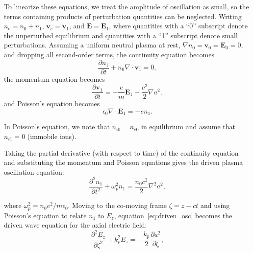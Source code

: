     To linearize these equations, we treat the amplitude of oscillation as
    small, so the terms containing products of perturbation quantities can be
    neglected. Writing $n_e = n_0 + n_1$, 
    $\mathbf{v}_e = \mathbf{v}_1$, and $\mathbf{E} = \mathbf{E}_1$,
    where quantities with a ``0'' subscript denote the unperturbed equilibrium 
    and quantities with a ``1'' subscript denote small perturbations. Assuming
    a uniform neutral plasma at rest, $\nabla n_0 = \mathbf{v}_0 = 
    \mathbf{E}_0 = 0$, and dropping all second-order terms, the continuity
    equation becomes
    \begin{equation*}
        \frac{\partial n_1}{\partial t} + n_0\nabla\cdot\mathbf{v}_1 = 0,
    \end{equation*}
    the momentum equation becomes
    \begin{equation*}
        \frac{\partial \mathbf{v}_1}{\partial t} = 
        -\frac{e}{m}\mathbf{E}_1 - \frac{c^2}{2}\nabla a^2,
    \end{equation*}
    and Poisson's equation becomes
    \begin{equation*}
        \epsilon_0\nabla\cdot\mathbf{E}_1 = -en_1.
    \end{equation*}

    \begin{note}
    In Poisson's equation, we note that $n_{i0} = n_{e0}$ in 
    equilibrium and assume that $n_{i1} = 0$ (immobile ions).
    \end{note}
    \vspace{1em}

    Taking the partial derivative (with respect to time) of the continuity 
    equation and substituting the momentum and Poisson equations gives the 
    driven plasma oscillation equation:
    \begin{equation}
        \frac{\partial^2 n_1}{\partial t^2} + \omega_p^2 n_1 = 
        \frac{n_0 c^2}{2}\nabla^2 a^2,
        \label{eq:driven_osc}
    \end{equation}

    where $\omega_p^2 = n_0 e^2 / m \epsilon_0 $. Moving to the 
    co-moving frame $\zeta = z - ct$ and using Poisson's equation to relate 
    $n_1$ to $E_z$, equation~\eqref{eq:driven_osc} becomes the driven wave 
    equation for the axial electric field:
    \begin{equation}
        \frac{\partial^2 E_z}{\partial\zeta^2} + k_p^2 E_z = 
        -\frac{k_p}{2}\frac{\partial a^2}{\partial\zeta},
        \label{eq:driven_wake}
    \end{equation} 

